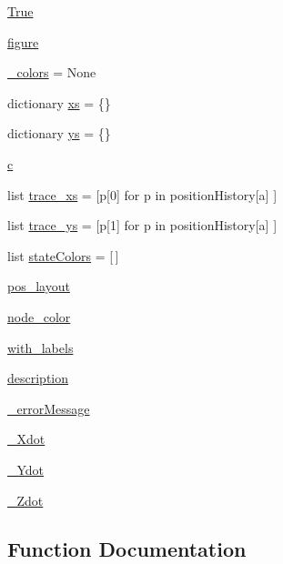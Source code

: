 \begin{DoxyCompactItemize}
\item 
\hyperlink{namespace_mu_mo_t_a643a20c0c59588a0f741a6095e2025fd}{True}
\item 
\hyperlink{namespace_mu_mo_t_a391e34f2de441d79152a7b3d6e4c9c86}{figure}
\item 
\hyperlink{namespace_mu_mo_t_a6aaed74c935ed5380691798f75527a18}{\+\_\+colors} = None
\item 
dictionary \hyperlink{namespace_mu_mo_t_a11c4a8ddcf95c6593dedd96d8052e6de}{xs} = \{\}
\item 
dictionary \hyperlink{namespace_mu_mo_t_a33cb91153ac5093db96e5a51490a2688}{ys} = \{\}
\item 
\hyperlink{namespace_mu_mo_t_ae0323a9039add2978bf5b49550572c7c}{c}
\item 
list \hyperlink{namespace_mu_mo_t_a7499a80aaa71437a9a52e15807a09dc0}{trace\+\_\+xs} = \mbox{[}p\mbox{[}0\mbox{]} for p in position\+History\mbox{[}a\mbox{]} \mbox{]}
\item 
list \hyperlink{namespace_mu_mo_t_a2ebf396b2ffd60c12ada6dd589c3e216}{trace\+\_\+ys} = \mbox{[}p\mbox{[}1\mbox{]} for p in position\+History\mbox{[}a\mbox{]} \mbox{]}
\item 
list \hyperlink{namespace_mu_mo_t_af61c8db681f18f2d8d0839f5cb4bacc6}{state\+Colors} = \mbox{[}$\,$\mbox{]}
\item 
\hyperlink{namespace_mu_mo_t_acf0720944bad86d351ddcc7f2a3b9467}{pos\+\_\+layout}
\item 
\hyperlink{namespace_mu_mo_t_ac064787e06c92df108217ae8e408e017}{node\+\_\+color}
\item 
\hyperlink{namespace_mu_mo_t_ad55aeef6b29ba6c9a5f77e76b016da92}{with\+\_\+labels}
\item 
\hyperlink{namespace_mu_mo_t_a2661f439a4a94ffdcd5e47ae1da0bb1d}{description}
\item 
\hyperlink{namespace_mu_mo_t_afb9cc1f1f0c08393b454f526842425cc}{\+\_\+error\+Message}
\item 
\hyperlink{namespace_mu_mo_t_a0f5fba57766067c941f5a96b22545ed4}{\+\_\+\+Xdot}
\item 
\hyperlink{namespace_mu_mo_t_a31f5ad9d4a349b00e06772177200c217}{\+\_\+\+Ydot}
\item 
\hyperlink{namespace_mu_mo_t_a4008c2e6651cb1bf1c9c1af3e962a25d}{\+\_\+\+Zdot}
\end{DoxyCompactItemize}


\subsection{Function Documentation}
\mbox{\label{namespace_mu_mo_t_a1249cdf9ce390fbd69d863d4bff76be4}} 
